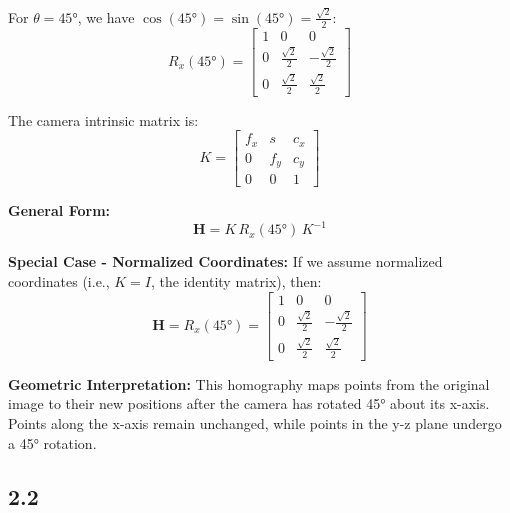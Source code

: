 \documentclass[12pt]{article}
\begin{document}
For $\theta = 45°$, we have $\cos(45°) = \sin(45°) = \frac{\sqrt{2}}{2}$:
\[
R_x(45°) = \begin{bmatrix}
1 & 0 & 0 \\
0 & \frac{\sqrt{2}}{2} & -\frac{\sqrt{2}}{2} \\
0 & \frac{\sqrt{2}}{2} & \frac{\sqrt{2}}{2}
\end{bmatrix}
\]

The camera intrinsic matrix is:
\[
K = \begin{bmatrix}
f_x & s & c_x \\
0 & f_y & c_y \\
0 & 0 & 1
\end{bmatrix}
\]

\textbf{General Form:}
\[
\boxed{\mathbf{H} = K \, R_x(45°) \, K^{-1}}
\]

\textbf{Special Case - Normalized Coordinates:}
If we assume normalized coordinates (i.e., $K = I$, the identity matrix), then:
\[
\boxed{\mathbf{H} = R_x(45°) = \begin{bmatrix}
1 & 0 & 0 \\
0 & \frac{\sqrt{2}}{2} & -\frac{\sqrt{2}}{2} \\
0 & \frac{\sqrt{2}}{2} & \frac{\sqrt{2}}{2}
\end{bmatrix}}
\]

\textbf{Geometric Interpretation:}
This homography maps points from the original image to their new positions after the camera has rotated 45° about its x-axis. Points along the x-axis remain unchanged, while points in the y-z plane undergo a 45° rotation.

\subsection*{2.2}
\end{document}
